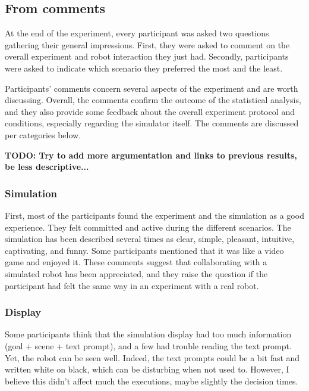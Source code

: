 

\subsection{From comments}

At the end of the experiment, every participant was asked two questions gathering their general impressions. First, they were asked to comment on the overall experiment and robot interaction they just had. Secondly, participants were asked to indicate which scenario they preferred the most and the least. 

Participants' comments concern several aspects of the experiment and are worth discussing. Overall, the comments confirm the outcome of the statistical analysis, and they also provide some feedback about the overall experiment protocol and conditions, especially regarding the simulator itself. The comments are discussed per categories below. 

\textbf{TODO: Try to add more argumentation and links to previous results, be less descriptive...}

\subsubsection{Simulation}
First, most of the participants found the experiment and the simulation as a good experience. They felt committed and active during the different scenarios. 
The simulation has been described several times as clear, simple, pleasant, intuitive, captivating, and funny. 
Some participants mentioned that it was like a video game and enjoyed it. 
These comments suggest that collaborating with a simulated robot has been appreciated, and they raise the question if the participant had felt the same way in an experiment with a real robot. 

\subsubsection{Display}
Some participants think that the simulation display had too much information (goal + scene + text prompt), and a few had trouble reading the text prompt. Yet, the robot can be seen well. Indeed, the text prompts could be a bit fast and written white on black, which can be disturbing when not used to. However, I believe this didn't affect much the executions, maybe slightly the decision times. 

